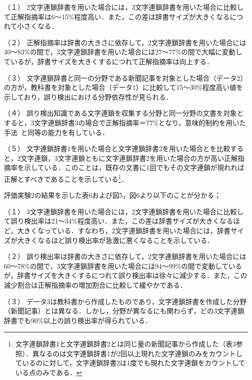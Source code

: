\begin{description}
\item{（１）}
2文字連鎖辞書を用いた場合には，3文字連鎖辞書を用いた場合に比較して正解指摘率は6〜15\%程度高い．また，この差は辞書サイズが大きくなるにつれて小さくなる．
\item{（２）}
正解指摘率は辞書の大きさに依存して，2文字連鎖辞書を用いた場合には40〜83\%の間で，3文字連鎖辞書を用いた場合には27〜77\%の間で大幅に変動しているが，辞書サイズを大きくするにつれて正解指摘率は向上する．
\item{（３）}
文字連鎖辞書と同一の分野である新聞記事を対象とした場合（データ2）の方が，教科書を対象とした場合（データ1）に比較して15〜30\%程度高い値を示しており，誤り検出における分野依存性が見られる．
\item{（４）}
誤り検出知識である文字連鎖を収集する分野と同一分野の文書を対象とすると，3文字連鎖辞書3の場合で正解指摘率＝77\%となり，意味的制約を用いた手法~\cite{Oku1996}と同等の能力を有している．
\item{（５）}
文字連鎖辞書1を用いた場合と文字連鎖辞書2を用いた場合とを比較すると，2文字連鎖，3文字連鎖ともに文字連鎖辞書2を用いた場合の方が高い正解指摘率を示している．このことは，既存の文書に1回でもその文字連鎖が現れれば正解とすべきであることを示している\footnote{文字連鎖辞書1と文字連鎖辞書2とは同じ量の新聞記事から作成した（表3参照）．異なるのは文字連鎖辞書1が2回以上現れた文字連鎖のみをカウントしているのに対して，文字連鎖辞書2は1度でも現れた文字連鎖をカウントしている点のみである．}．
\end{description}



\smallskip
\indent
評価実験2の結果を示した表6および図5，図6より以下のことが分かる；
\begin{description}
\item{（１）}
3文字連鎖辞書を用いた場合には，2文字連鎖辞書を用いた場合に比較して誤り検出率は21〜34\%程度高い．また，この差は辞書サイズが大きくなるほど，大きくなっている．すなわち，2文字連鎖辞書を用いた場合には，辞書サイズが大きくなるほど誤り検出率が急激に悪くなることを示している．
\item{（２）}
誤り検出率は辞書の大きさに依存して，2文字連鎖辞書を用いた場合には60〜78\%の間で，3文字連鎖辞書を用いた場合には94〜99\%の間で変動しているが，辞書サイズを大きくするにつれて誤り検出率は徐々に減少する．また，この減少割合は正解指摘率の増加割合に比較して緩やかである．
\item{（３）}
データ3は教科書から作成したものであり，文字連鎖辞書を作成した分野（新聞記事）とは異なる．しかし，分野が異なるにも関わらず，どの3文字連鎖辞書でも90\%以上の誤り検出率が得られている．
\end{description}

